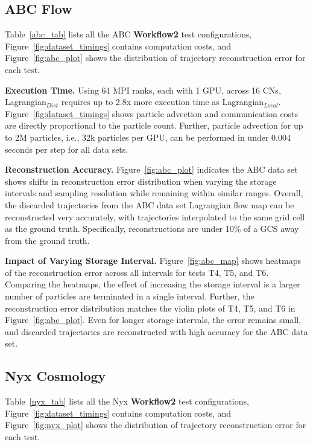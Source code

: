 
\subsection{ABC Flow}
\label{sec:abc}

Table~\ref{abc_tab} lists all the ABC \textbf{Workflow2} test configurations, Figure~\ref{fig:dataset_timings} contains computation costs, and Figure~\ref{fig:abc_plot} shows the distribution of trajectory reconstruction error for each test.
%



\textbf{Execution Time.} Using 64 MPI ranks, each with 1 GPU, across 16 CNs, Lagrangian$_{Dist}$ requires up to 2.8x more execution time as Lagrangian$_{Local}$.
%
Figure~\ref{fig:dataset_timings} shows particle advection and communication costs are directly proportional to the particle count.
%
Further, particle advection for up to 2M particles, i.e., 32k particles per GPU, can be performed in under 0.004 seconds per step for all data sets.
%


\textbf{Reconstruction Accuracy.} Figure~\ref{fig:abc_plot} indicates the ABC data set shows shifts in reconstruction error distribution when varying the storage intervals and sampling resolution while remaining within similar ranges.
%
Overall, the discarded trajectories from the ABC data set Lagrangian flow map can be reconstructed very accurately, with trajectories interpolated to the same grid cell as the ground truth.
%
Specifically, reconstructions are under 10\% of a GCS away from the ground truth.
%

\textbf{Impact of Varying Storage Interval.} Figure~\ref{fig:abc_map} shows heatmaps of the reconstruction error across all intervals for tests T4, T5, and T6.
%
Comparing the heatmaps, the effect of increasing the storage interval is a larger number of particles are terminated in a single interval. 
%
Further, the reconstruction error distribution matches the violin plots of T4, T5, and T6 in Figure~\ref{fig:abc_plot}. 
%
Even for longer storage intervals, the error remains small, and discarded trajectories are reconstructed with high accuracy for the ABC data set.

\subsection{Nyx Cosmology}
\label{sec:nyx}
Table~\ref{nyx_tab} lists all the Nyx \textbf{Workflow2} test configurations, Figure~\ref{fig:dataset_timings} contains computation costs, and Figure~\ref{fig:nyx_plot} shows the distribution of trajectory reconstruction error for each test.
%


